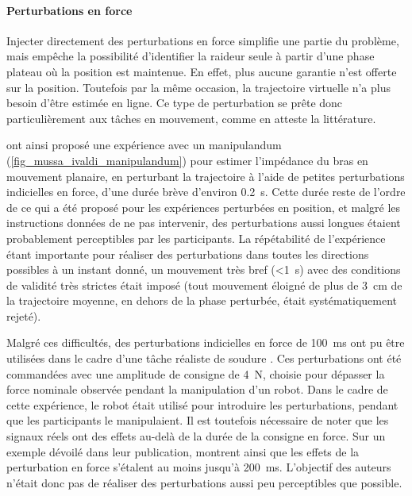 \paragraph{Perturbations en force}

Injecter directement des perturbations en force simplifie une partie du problème, mais empêche la possibilité d'identifier la raideur seule à partir d'une phase plateau où la position est maintenue. En effet, plus aucune garantie n'est offerte sur la position. Toutefois par la même occasion, la trajectoire virtuelle n'a plus besoin d'être estimée en ligne. Ce type de perturbation se prête donc particulièrement aux tâches en mouvement, comme en atteste la littérature.

\textcite{gomi_human_1997} ont ainsi proposé une expérience avec un manipulandum (\cref{fig_mussa_ivaldi_manipulandum}) pour estimer l'impédance du bras en mouvement planaire, en perturbant la trajectoire à l'aide de petites perturbations indicielles en force, d'une durée brève d'environ \SI{0.2}{\second}. Cette durée reste de l'ordre de ce qui a été proposé pour les expériences perturbées en position, et malgré les instructions données de ne pas intervenir, des perturbations aussi longues étaient probablement perceptibles par les participants. La répétabilité de l'expérience étant importante pour réaliser des perturbations dans toutes les directions possibles à un instant donné, un mouvement très bref (<\SI{1}{\second}) avec des conditions de validité très strictes était imposé (tout mouvement éloigné de plus de \SI{3}{\centi\meter} de la trajectoire moyenne, en dehors de la phase perturbée, était systématiquement rejeté).

Malgré ces difficultés, des perturbations indicielles en force de \SI{100}{\milli\second} ont pu être utilisées dans le cadre d'une tâche réaliste de soudure \parencite{erden_hand_2015}. Ces perturbations ont été commandées avec une amplitude de consigne de \SI{4}{\newton}, choisie pour dépasser la force nominale observée pendant la manipulation d'un robot. Dans le cadre de cette expérience, le robot était utilisé pour introduire les perturbations, pendant que les participants le manipulaient. Il est toutefois nécessaire de noter que les signaux réels ont des effets au-delà de la durée de la consigne en force. Sur un exemple dévoilé dans leur publication, \textcite{erden_hand_2015} montrent ainsi que les effets de la perturbation en force s'étalent au moins jusqu'à \SI{200}{\milli\second}. L'objectif des auteurs n'était donc pas de réaliser des perturbations aussi peu perceptibles que possible.

